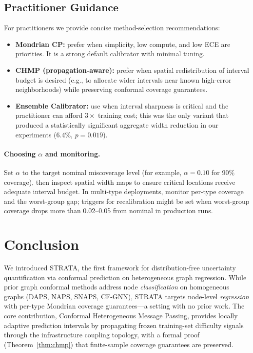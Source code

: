 \documentclass[twoside,11pt]{article}
\begin{document}
\subsection{Practitioner Guidance}

For practitioners we provide concise method-selection recommendations:
\begin{itemize}
\item \textbf{Mondrian CP:} prefer when simplicity, low compute, and low ECE
are priorities. It is a strong default calibrator with minimal tuning.
\item \textbf{CHMP (propagation-aware):} prefer when spatial
redistribution of interval budget is desired (e.g., to allocate wider
intervals near known high-error neighborhoods) while preserving conformal
coverage guarantees.
\item \textbf{Ensemble Calibrator:} use when interval sharpness is critical and
the practitioner can afford $3\times$ training cost; this was the only variant
that produced a statistically significant aggregate width reduction in our
experiments ($6.4\%$, $p = 0.019$).
\end{itemize}

\paragraph{Choosing $\alpha$ and monitoring.} Set $\alpha$ to the
target nominal miscoverage level (for example, $\alpha = 0.10$ for 90\%
coverage), then inspect spatial width maps to ensure critical locations receive
adequate interval budget. In multi-type deployments, monitor per-type coverage
and the worst-group gap; triggers for recalibration might be set when
worst-group coverage drops more than 0.02--0.05 from nominal in production
runs.

\section{Conclusion}
\label{sec:conclusion}

We introduced STRATA, the first framework for distribution-free uncertainty
quantification via conformal prediction on heterogeneous graph regression.
While prior graph conformal methods address node \emph{classification} on
homogeneous graphs (DAPS, NAPS, SNAPS, CF-GNN), STRATA targets node-level
\emph{regression} with per-type Mondrian coverage guarantees---a setting with
no prior work. The core contribution, Conformal Heterogeneous Message Passing,
provides locally adaptive prediction intervals by propagating frozen
training-set difficulty signals through the infrastructure coupling
topology, with a formal proof (Theorem~\ref{thm:chmp}) that finite-sample
coverage guarantees are preserved.
\end{document}
